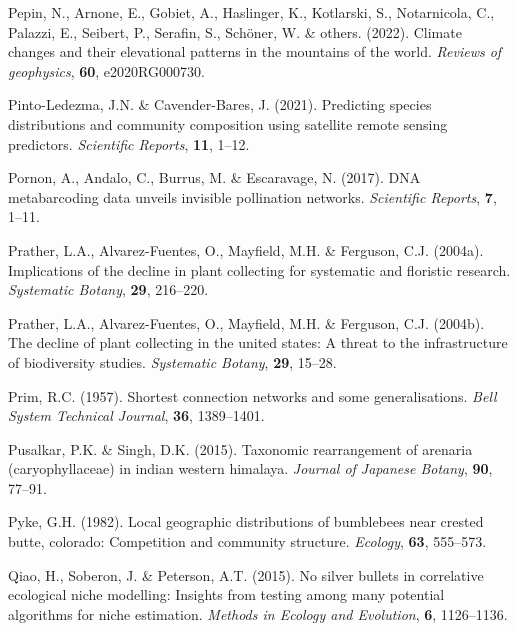 \documentclass[
]{article}
\newlength{\cslhangindent}
\newlength{\cslentryspacingunit} %
\newenvironment{CSLReferences}[2] %
 {%
  \setlength{\parindent}{0pt}
  \ifodd #1
  \let\oldpar\par
  \def\par{\hangindent=\cslhangindent\oldpar}
  \fi
  \setlength{\parskip}{#2\cslentryspacingunit}
 }%
 {}
\begin{document}
\begin{CSLReferences}{1}{0}
\leavevmode{}%
Pepin, N., Arnone, E., Gobiet, A., Haslinger, K., Kotlarski, S.,
Notarnicola, C., Palazzi, E., Seibert, P., Serafin, S., Schöner, W. \&
others. (2022). Climate changes and their elevational patterns in the
mountains of the world. \emph{Reviews of geophysics}, \textbf{60},
e2020RG000730.

\leavevmode{}%
Pinto-Ledezma, J.N. \& Cavender-Bares, J. (2021). Predicting species
distributions and community composition using satellite remote sensing
predictors. \emph{Scientific Reports}, \textbf{11}, 1--12.

\leavevmode{}%
Pornon, A., Andalo, C., Burrus, M. \& Escaravage, N. (2017). DNA
metabarcoding data unveils invisible pollination networks.
\emph{Scientific Reports}, \textbf{7}, 1--11.

\leavevmode{}%
Prather, L.A., Alvarez-Fuentes, O., Mayfield, M.H. \& Ferguson, C.J.
(2004a). Implications of the decline in plant collecting for systematic
and floristic research. \emph{Systematic Botany}, \textbf{29}, 216--220.

\leavevmode{}%
Prather, L.A., Alvarez-Fuentes, O., Mayfield, M.H. \& Ferguson, C.J.
(2004b). The decline of plant collecting in the united states: A threat
to the infrastructure of biodiversity studies. \emph{Systematic Botany},
\textbf{29}, 15--28.

\leavevmode{}%
Prim, R.C. (1957). Shortest connection networks and some
generalisations. \emph{Bell System Technical Journal}, \textbf{36},
1389--1401.

\leavevmode{}%
Pusalkar, P.K. \& Singh, D.K. (2015). Taxonomic rearrangement of
arenaria (caryophyllaceae) in indian western himalaya. \emph{Journal of
Japanese Botany}, \textbf{90}, 77--91.

\leavevmode{}%
Pyke, G.H. (1982). Local geographic distributions of bumblebees near
crested butte, colorado: Competition and community structure.
\emph{Ecology}, \textbf{63}, 555--573.

\leavevmode{}%
Qiao, H., Soberon, J. \& Peterson, A.T. (2015). No silver bullets in
correlative ecological niche modelling: Insights from testing among many
potential algorithms for niche estimation. \emph{Methods in Ecology and
Evolution}, \textbf{6}, 1126--1136.


\end{CSLReferences}
\end{document}
